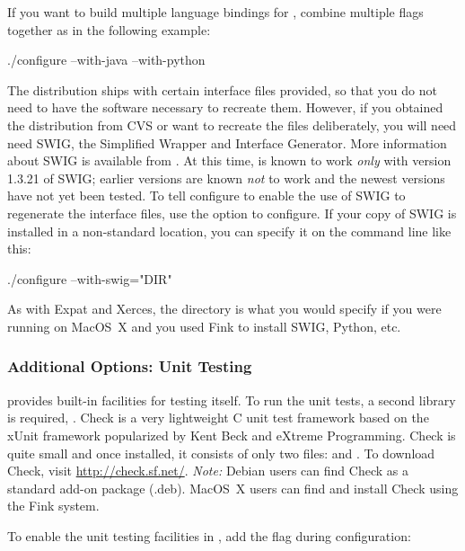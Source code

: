 \documentclass{sbmlmanual}
\begin{document}
If you want to build multiple language bindings for \libsbml{}, combine
multiple flags together as in the following example:

\begin{example}[csh]
  ./configure --with-java --with-python
\end{example}

The \libsbml{} distribution ships with certain interface files provided, so
that you do not need to have the software necessary to recreate them.
However, if you obtained the \libsbml{} distribution from CVS or want to
recreate the files deliberately, you will need need SWIG, the Simplified
Wrapper and Interface Generator.  More information about SWIG is available
from .  At this time, \libsbml{} is known to
work \emph{only} with version 1.3.21 of SWIG; earlier versions are known
\emph{not} to work and the newest versions have not yet been tested.  To
tell configure to enable the use of SWIG to regenerate the interface files,
use the  option to configure.  If your copy of SWIG is
installed in a non-standard location, you can specify it on the
 command line like this:

\begin{example}[csh]
  ./configure --with-swig="DIR"
\end{example}

As with Expat and Xerces, the  directory is what you would
specify if you were running on MacOS~X and you used Fink to install SWIG,
Python, etc.


\subsubsection{Additional Options: Unit Testing}

\libsbml{} provides built-in facilities for testing itself.  To run the
unit tests, a second library is required, .  Check is a
very lightweight C unit test framework based on the xUnit framework
popularized by Kent Beck and eXtreme Programming.  Check is quite small
and once installed, it consists of only two files:  and
.  To download Check, visit \url{http://check.sf.net/}.
\emph{Note:} Debian users can find Check as a standard add-on package
(.deb).  MacOS~X users can find and install Check using the Fink system.

To enable the unit testing facilities in \libsbml{}, add the
 flag during configuration:
\end{document}
